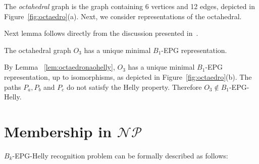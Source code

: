 \documentclass[runningheads]{llncs}
\begin{document}
The \textit{octahedral} graph is the graph containing 6 vertices and 12 edges, depicted  in Figure~\ref{fig:octaedro}(a). Next, we consider representations of the octahedral.


Next lemma follows directly from the discussion presented in~\cite{heldt2014}.

\begin{lemma}\label{lem:octaedronaohelly}
The octahedral graph $O_3$ has a unique minimal  $ B_1$-EPG representation.%
\end{lemma}


 

By Lemma ~\ref{lem:octaedronaohelly},  $ O_3 $ has a unique minimal $B_1$-EPG representation, up to isomorphisms, as depicted in Figure~\ref{fig:octaedro}(b). The paths $ P_{a}, P_{b} $ and $ P_{c} $  do not satisfy the Helly property. Therefore $O_3 \notin B_1$-EPG-Helly. 

\section{Membership in $\mathcal{NP}$} 

{\sc $B_k$-EPG-Helly recognition} problem can be formally described as follows:

\end{document}

